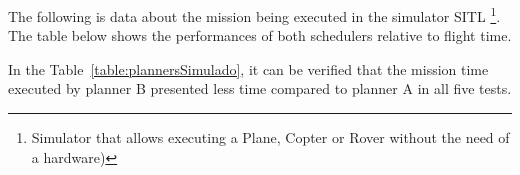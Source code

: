 \documentclass[conference,harvard,brazil,english]{sbatex}
\begin{document}

The following is data about the mission being executed in the simulator SITL \footnote{Simulator that allows executing a Plane, Copter or Rover without the need of a hardware)}. The table below shows the performances of both schedulers relative to flight time.

\begin{table}[H]
\centering
\caption{Mission Planners Flight Time - Simulator.\label{table:plannersSimulado}}
\end{table}

In the Table~\ref{table:plannersSimulado}, it can be verified that the mission time executed by planner B presented less time compared to planner A in all five tests.
\end{document}

